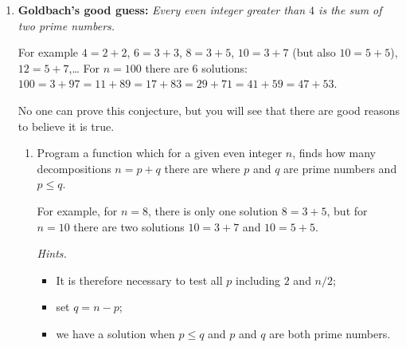 \documentclass[11pt,class=report,crop=false]{standalone}
\begin{document}






\begin{activite}


\begin{enumerate}
  \item \textbf{Goldbach's good guess: } \emph{Every even integer greater than $4$ is the sum of two prime numbers.}

  For example $4 = 2+2$, $6=3+3$, $8=3+5$, $10=3+7$ (but also $10=5+5$), $12 = 5+7$,\ldots{}
  For $n=100$ there are $6$ solutions: $100=3+97=11+89=17+83=29+71=41+59=47+53$.
  
  No one can prove this conjecture, but you will see that there are good reasons to believe it is true.
  
  \begin{enumerate}
    \item Program a  function which for a given even integer $n$, finds how many decompositions $n=p+q$ there are where $p$ and $q$ are prime numbers and $p\le q$.
    
    For example, for $n=8$, there is only one solution $8=3+5$, but for $n=10$ there are two solutions $10 = 3+7$ and $10=5+5$.
 
   \emph{Hints.} 
   \begin{itemize}
     \item It is therefore necessary to test all $p$ including $2$ and $n/2$;
     \item set $q = n - p$;
     \item we have a solution when $p \le q$ and $p$ and $q$ are both prime numbers.
   \end{itemize}
   

\end{enumerate}
\end{enumerate}
\end{activite}
\end{document}
